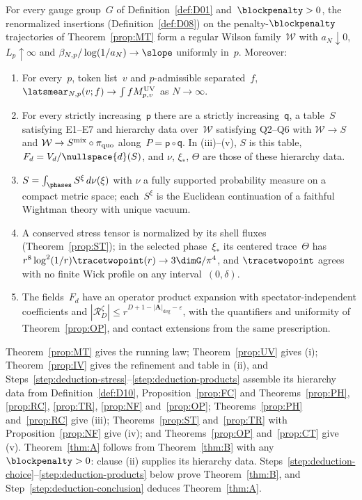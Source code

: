 \begin{maintheorem}[Construction]\label{thm:B}
For every gauge group~$G$ of Definition~\ref{def:D01} and~$\blockpenalty>0$, the renormalized insertions (Definition~\ref{def:D08}) on the penalty-$\blockpenalty$ trajectories of Theorem~\ref{prop:MT} form a regular Wilson family~$\mathcal W$ with $a_N\downarrow0$, $L_p\uparrow\infty$ and $\beta_{N,p}/\log(1/a_N)\to\slope$ uniformly in~$p$. Moreover:
\begin{enumerate}[label=\textup{(\roman*)},nosep]
\item For every~$p$, token list~$v$ and $p$-admissible separated~$f$, $\latsmear_{N,p}(v;f)\to\int fM^{\rm UV}_{p,v}$ as $N\to\infty$.
\item For every strictly increasing~$\mathsf p$ there are a strictly increasing~$\mathsf q$, a table~$S$ satisfying E1--E7 and hierarchy data over~$\mathcal W$ satisfying Q2--Q6 with $\mathcal W\to S$ and $\mathcal W\to S^{\rm mix}\circ\pi_{\rm quo}$ along~$P=\mathsf p\circ\mathsf q$. In (iii)--(v), $S$ is this table, $F_d=V_d/\nullspace{d}(S)$, and $\nu$, $\xi_*$, $\Theta$ are those of these hierarchy data.
\item $S=\int_{\phases}S^\xi\,d\nu(\xi)$ with $\nu$ a fully supported probability measure on a compact metric space; each~$S^\xi$ is the Euclidean continuation of a faithful Wightman theory with unique vacuum.
\item A conserved stress tensor is normalized by its shell fluxes (Theorem~\ref{prop:ST}); in the selected phase~$\xi_*$ its centered trace~$\Theta$ has $r^8\log^2(1/r)\tracetwopoint(r)\to3\dimG/\pi^4$, and $\tracetwopoint$ agrees with no finite Wick profile on any interval~$(0,\delta)$.
\item The fields~$F_d$ have an operator product expansion with spectator-independent coefficients and $|\mathcal R_D^\zeta|\le r^{D+1-|\boldsymbol A|_{\deg}-\varepsilon}$, with the quantifiers and uniformity of Theorem~\ref{prop:OP}, and contact extensions from the same prescription.
\end{enumerate}
\end{maintheorem}

Theorem~\ref{prop:MT} gives the running law; Theorem~\ref{prop:UV} gives (i); Theorem~\ref{prop:IV} gives the refinement and table in (ii), and Steps~\ref{step:deduction-stress}--\ref{step:deduction-products} assemble its hierarchy data from Definition~\ref{def:D10}, Proposition~\ref{prop:FC} and Theorems~\ref{prop:PH}, \ref{prop:RC}, \ref{prop:TR}, \ref{prop:NF} and~\ref{prop:OP}; Theorems~\ref{prop:PH} and~\ref{prop:RC} give (iii); Theorems~\ref{prop:ST} and~\ref{prop:TR} with Proposition~\ref{prop:NF} give (iv); and Theorems~\ref{prop:OP} and~\ref{prop:CT} give (v). Theorem~\ref{thm:A} follows from Theorem~\ref{thm:B} with any~$\blockpenalty>0$: clause (ii) supplies its hierarchy data. Steps~\ref{step:deduction-choice}--\ref{step:deduction-products} below prove Theorem~\ref{thm:B}, and Step~\ref{step:deduction-conclusion} deduces Theorem~\ref{thm:A}.

